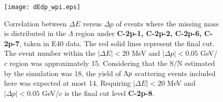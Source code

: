 \begin{figure}[!h]
  \begin{center}
    \texttt{[image: dEdp\_wpi.eps]}
    \caption{Correlation between $\Delta E$ versus $\Delta p$ of events where the missing mass is distributed in the $\Lambda$ region under {\bf C-2p-1, C-2p-2, C-2p-6, C-2p-7}, taken in E40 data. The red solid lines represent the final cut. The event number within the $|\Delta E|<20$ MeV and $|\Delta p|<0.05$ GeV/$c$ region was approximately 15. Considering that the S/N estimated by the simulation was 18, the yield of $\Lambda p$ scattering events included here was expected at most 14. Requiring $|\Delta E|<20$ MeV and $|\Delta p|<0.05$ GeV/$c$ is the final cut level {\bf C-2p-8}.}
    \label{fig-dEdp_wpi}
  \end{center}
\end{figure}


